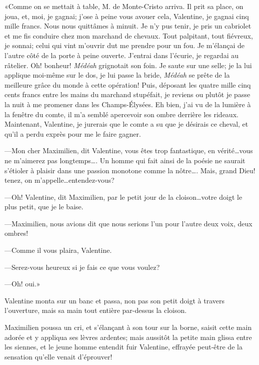 «Comme on se mettait à table, M. de Monte-Cristo arriva. Il prit sa place, on joua, et, moi, je gagnai; j'ose à peine vous avouer cela, Valentine, je gagnai cinq mille francs. Nous nous quittâmes à minuit. Je n'y pus tenir, je pris un cabriolet et me fis conduire chez mon marchand de chevaux. Tout palpitant, tout fiévreux, je sonnai; celui qui vint m'ouvrir dut me prendre pour un fou. Je m'élançai de l'autre côté de la porte à peine ouverte. J'entrai dans l'écurie, je regardai au râtelier. Oh! bonheur! \textit{Médéah} grignotait son foin. Je saute sur une selle; je la lui applique moi-même sur le dos, je lui passe la bride, \textit{Médéah} se prête de la meilleure grâce du monde à cette opération! Puis, déposant les quatre mille cinq cents francs entre les mains du marchand stupéfait, je reviens ou plutôt je passe la nuit à me promener dans les Champs-Élysées. Eh bien, j'ai vu de la lumière à la fenêtre du comte, il m'a semblé apercevoir son ombre derrière les rideaux. Maintenant, Valentine, je jurerais que le comte a su que je désirais ce cheval, et qu'il a perdu exprès pour me le faire gagner. 

—Mon cher Maximilien, dit Valentine, vous êtes trop fantastique, en vérité\dots vous ne m'aimerez pas longtemps\dots. Un homme qui fait ainsi de la poésie ne saurait s'étioler à plaisir dans une passion monotone comme la nôtre\dots. Mais, grand Dieu! tenez, on m'appelle\dots entendez-vous? 

—Oh! Valentine, dit Maximilien, par le petit jour de la cloison\dots votre doigt le plus petit, que je le baise. 

—Maximilien, nous avions dit que nous serions l'un pour l'autre deux voix, deux ombres! 

—Comme il vous plaira, Valentine. 

—Serez-vous heureux si je fais ce que vous voulez? 

—Oh! oui.» 

Valentine monta sur un banc et passa, non pas son petit doigt à travers l'ouverture, mais sa main tout entière par-dessus la cloison. 

Maximilien poussa un cri, et s'élançant à son tour sur la borne, saisit cette main adorée et y appliqua ses lèvres ardentes; mais aussitôt la petite main glissa entre les siennes, et le jeune homme entendit fuir Valentine, effrayée peut-être de la sensation qu'elle venait d'éprouver! 